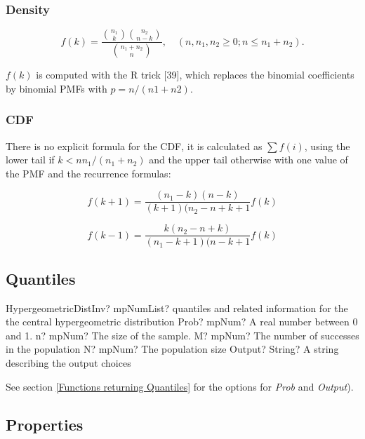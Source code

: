 \subsubsection{Density}
\label{HypergeometricDistributionDensity}

\begin{equation} 
	f(k) = \frac{\binom{n_1}{k} \binom{n_2}{n-k}}{\binom{n_1+n_2}{n}}, \quad (n,n_1,n_2 \geq 0; n \leq n_1+n_2).
\end{equation}

$f(k)$ is computed with the R trick [39], which replaces the binomial coefficients by
binomial PMFs with $p = n/(n1 + n2)$.


\subsubsection{CDF}
There is no explicit formula for the CDF, it is calculated as $\sum f(i)$, using the lower tail if $k < nn_1/(n_1 + n_2)$ and the upper tail otherwise with one value of the PMF and the recurrence formulas:

\begin{equation} 
	f(k+1)= \frac{(n_1 - k)(n-k)}{(k+1)(n_2 - n+k+1} f(k)
\end{equation}

\begin{equation} 
	f(k-1)= \frac{k(n_2 - n + k)}{(n_1 - k+1)(n-k+1} f(k)
\end{equation}

\subsection{Quantiles}


\begin{mpFunctionsExtract}
	\mpFunctionFiveNotImplemented
	{HypergeometricDistInv? mpNumList? quantiles and related information for the the central hypergeometric distribution}
	{Prob? mpNum? A real number between 0 and 1.}
	{n? mpNum? The size of the sample.}
	{M? mpNum? The number of successes in the population}
	{N? mpNum? The population size}
	{Output? String? A string describing the output choices}
\end{mpFunctionsExtract}

\vspace{0.3cm}
See section \ref{Functions returning Quantiles} for the options for  {\itshape\sffamily Prob} and {\itshape\sffamily Output}). 


\subsection{Properties}
\label{HypergeometricDistributionProperties}


